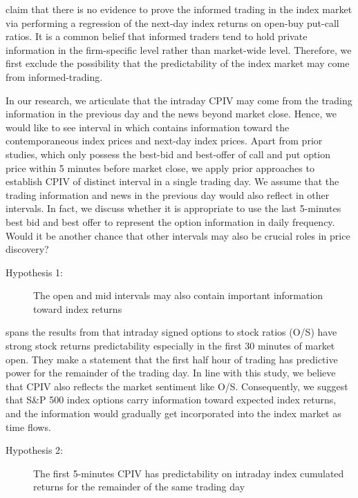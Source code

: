 
\textcite{pan2006information} claim that there is no evidence to prove the informed trading in the index market via performing a regression of the next-day index returns on open-buy put-call ratios. It is a common belief that informed traders tend to hold private information in the firm-specific level rather than market-wide level. Therefore, we first exclude the possibility that the predictability of the index market may come from informed-trading. 

In our research, we articulate that the intraday CPIV may come from the trading information in the previous day and the news beyond market close. Hence, we would like to see interval in which contains information toward the contemporaneous index prices and next-day index prices. Apart from prior studies, which only possess the best-bid and best-offer of call and put option price within 5 minutes before market close, we apply prior approaches to establish CPIV of distinct interval in a single trading day. We assume that the trading information and news in the previous day would also reflect in other intervals. In fact, we discuss whether it is appropriate to use the last 5-minutes best bid and best offer to represent the option information in daily frequency. Would it be another chance that other intervals may also be crucial roles in price discovery? 

\begin{description}
\item[Hypothesis 1:] The open and mid intervals may also contain important information toward index returns
\end{description}

\textcite{bergsma2018intraday} spans the results from \textcite{easley1998option} that intraday signed options to stock ratios (O/S) have strong stock returns predictability especially in the first 30 minutes of market open. They make a statement that the first half hour of trading has predictive power for the remainder of the trading day. In line with this study, we believe that CPIV also reflects the market sentiment like O/S. Consequently, we suggest that S\&P 500 index options carry information toward expected index returns, and the information would gradually get incorporated into the index market as time flows. 

\begin{description} 
\item[Hypothesis 2:] The first 5-minutes CPIV has predictability on intraday index cumulated returns for the remainder of the same trading day
\end{description}




